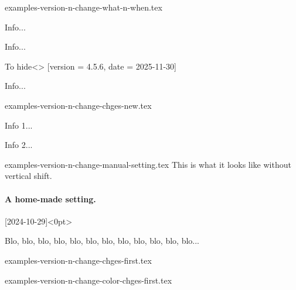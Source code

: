 \begin{filecontents*}[overwrite]{examples-version-n-change-what-n-when.tex}
\begin{tdoctech}[date      = 2024-10-29,
                 col-chges = red]
    \item Info...
\end{tdoctech}

\begin{tdocupdate}[version   = 1.2.3,
                   col-chges = ForestGreen,
                   col       = ForestGreen]
    \item Info...
\end{tdocupdate}

\begin{tdoctopic}{To hide}<\faEyeSlash>%
                 [version = 4.5.6,
                  date    = 2025-11-30]
    \item Info...
\end{tdoctopic}
\end{filecontents*}


\begin{filecontents*}[overwrite]{examples-version-n-change-chges-new.tex}
\begin{tdocnew}
    \item Info 1...
    \item Info 2...
\end{tdocnew}
\end{filecontents*}


\begin{filecontents*}[overwrite]{examples-version-n-change-manual-setting.tex}
This is what it looks like without vertical shift.

\paragraph{A home-made setting.}%
[2024-10-29]<0pt>

Blo, blo, blo, blo, blo, blo, blo, blo, blo, blo, blo, blo...
\end{filecontents*}


\begin{filecontents*}[overwrite]{examples-version-n-change-chges-first.tex}
\end{filecontents*}


\begin{filecontents*}[overwrite]{examples-version-n-change-color-chges-first.tex}
\end{filecontents*}


